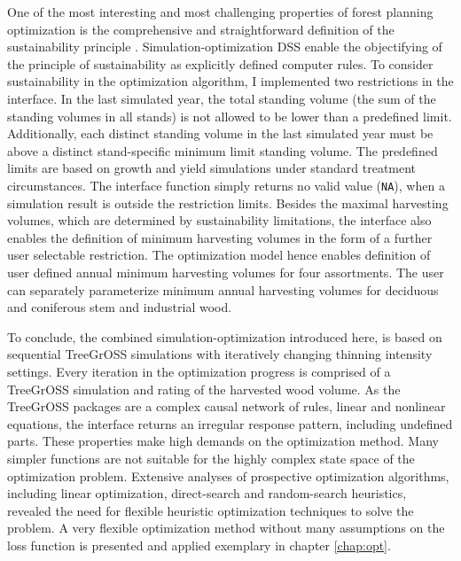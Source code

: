 One of the most interesting and most challenging properties of forest planning optimization is the comprehensive and straightforward definition of the sustainability principle \citep[p. 15]{kangas_2015}. Simulation-optimization DSS enable the objectifying of the principle of sustainability as explicitly defined computer rules. To consider sustainability in the optimization algorithm, I implemented two restrictions in the interface. In the last simulated year, the total standing volume (the sum of the standing volumes in all stands) is not allowed to be lower than a predefined limit. Additionally, each distinct standing volume in the last simulated year must be above a distinct stand-specific minimum limit standing volume. The predefined limits are based on growth and yield simulations under standard treatment circumstances. The interface function simply returns no valid value ({\tt NA}), when a simulation result is outside the restriction limits. Besides the maximal harvesting volumes, which are determined by sustainability limitations, the interface also enables the definition of minimum harvesting volumes in the form of a further user selectable restriction. The optimization model hence enables definition of user defined annual minimum harvesting volumes for four assortments. The user can separately parameterize minimum annual harvesting volumes for deciduous and coniferous stem and industrial wood.

To conclude, the combined simulation-optimization introduced here, is based on sequential TreeGrOSS simulations with iteratively changing thinning intensity settings. Every iteration in the optimization progress is comprised of a TreeGrOSS simulation and rating of the harvested wood volume. As the TreeGrOSS packages are a complex causal network of rules, linear and nonlinear equations, the interface returns an irregular response pattern, including undefined parts. These properties make high demands on the optimization method. Many simpler functions are not suitable for the highly complex state space of the optimization problem. Extensive analyses of prospective optimization algorithms, including linear optimization, direct-search and random-search heuristics, revealed the need for flexible heuristic optimization techniques to solve the problem. A very flexible optimization method without many assumptions on the loss function is presented and applied exemplary in chapter \ref{chap:opt}.


